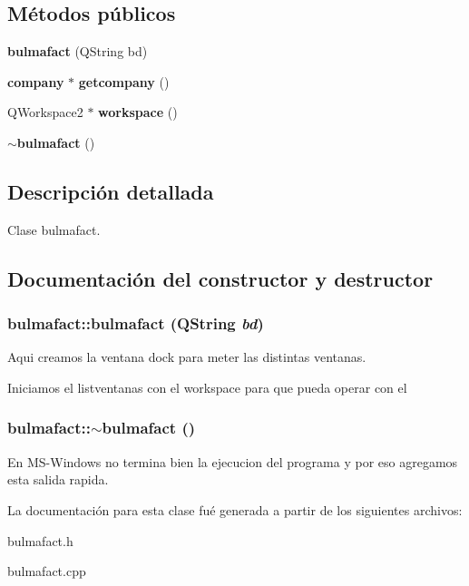 \subsection*{M\'{e}todos p\'{u}blicos}
\begin{CompactItemize}
\item 
{\bf bulmafact} (QString bd)
\item 
{\bf company} $\ast$ {\bf getcompany} ()\label{classbulmafact_a1}

\item 
QWorkspace2 $\ast$ {\bf workspace} ()\label{classbulmafact_a2}

\item 
{\bf $\sim$bulmafact} ()
\end{CompactItemize}


\subsection{Descripci\'{o}n detallada}
Clase bulmafact. 



\subsection{Documentaci\'{o}n del constructor y destructor}
\subsubsection{\setlength{\rightskip}{0pt plus 5cm}bulmafact::bulmafact (QString {\em bd})}\label{classbulmafact_a0}


Aqui creamos la ventana dock para meter las distintas ventanas.

Iniciamos el listventanas con el workspace para que pueda operar con el 
\subsubsection{\setlength{\rightskip}{0pt plus 5cm}bulmafact::$\sim$bulmafact ()}\label{classbulmafact_a3}


En MS-Windows no termina bien la ejecucion del programa y por eso agregamos esta salida rapida. 

La documentaci\'{o}n para esta clase fu\'{e} generada a partir de los siguientes archivos:\begin{CompactItemize}
\item 
bulmafact.h\item 
bulmafact.cpp\end{CompactItemize}
